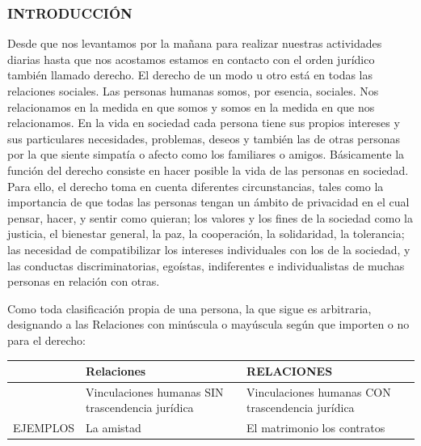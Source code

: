 \subsubsection*{INTRODUCCIÓN}
Desde que nos levantamos por la mañana para realizar nuestras actividades diarias hasta que nos acostamos estamos en contacto con el orden jurídico también llamado derecho. El derecho de un modo u otro está en todas las relaciones sociales. Las personas humanas somos, por esencia, sociales. Nos relacionamos en la medida en que somos y somos en la medida en que nos relacionamos. En la vida en sociedad cada persona tiene sus propios intereses y sus particulares necesidades, problemas, deseos y también las de otras personas por la que siente simpatía o afecto como los familiares o amigos. Básicamente la función del derecho consiste en hacer posible la vida de las personas en sociedad. Para ello, el derecho toma en cuenta diferentes circunstancias, tales como la importancia de que todas las personas tengan un ámbito de privacidad en el cual pensar, hacer, y sentir como quieran; los valores y los fines de la sociedad como la justicia, el bienestar general, la paz, la cooperación, la solidaridad, la tolerancia; las necesidad de compatibilizar los intereses individuales con los de la sociedad, y las conductas discriminatorias, egoístas, indiferentes e individualistas de muchas personas en relación con otras.

Como toda clasificación propia de una persona, la que sigue es arbitraria, designando a las Relaciones con minúscula o mayúscula según que importen o no para el derecho:


\begin{center}
\small
\begin{tabular}{|p{}|p{}|p{}|}
\hline
 & Relaciones & RELACIONES \\ \hline
 & Vinculaciones humanas SIN trascendencia jurídica & Vinculaciones humanas CON trascendencia jurídica \\ \hline
EJEMPLOS & La amistad & El matrimonio los contratos \\ \hline
\end{tabular}
\end{center}

